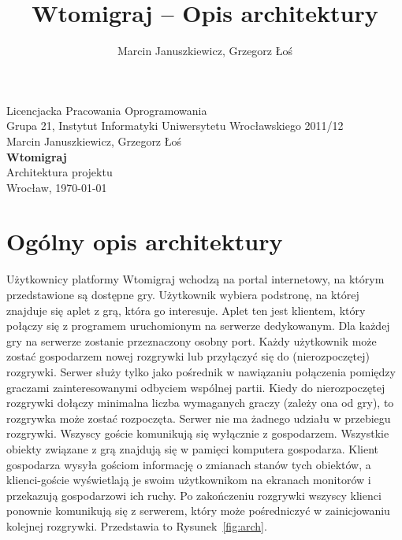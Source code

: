 \documentclass[a4paper, 12pt]{article}
\author{Marcin Januszkiewicz, Grzegorz Łoś}
\title{\textbf{Wtomigraj} -- Opis architektury}
\begin{document}

\begin{titlepage}
\begin{center}

\thispagestyle{empty}
{\Large Licencjacka Pracowania Oprogramowania}\\[0.5cm]
{\Large Grupa 21, Instytut Informatyki Uniwersytetu Wrocławskiego 2011/12}\\[2.5cm]

{\large Marcin Januszkiewicz, Grzegorz Łoś}\\[0.5cm]
{\huge \textbf{Wtomigraj}}\\[0.5cm]
{\huge Architektura projektu}\\[0.5cm]
\vfill
{\large Wrocław, \today}

\end{center}
\end{titlepage}

\setcounter{page}{2}

\tableofcontents

\break

\section{Ogólny opis architektury}

Użytkownicy platformy Wtomigraj wchodzą na portal internetowy, na którym przedstawione są dostępne gry. Użytkownik wybiera podstronę, na której znajduje się aplet z grą, która go interesuje. Aplet ten jest klientem, który połączy się z programem uruchomionym na serwerze dedykowanym. Dla każdej gry na serwerze zostanie przeznaczony osobny port. Każdy użytkownik może zostać gospodarzem nowej rozgrywki lub przyłączyć się do (nierozpoczętej) rozgrywki. Serwer służy tylko jako pośrednik w nawiązaniu połączenia pomiędzy graczami zainteresowanymi odbyciem wspólnej partii. Kiedy do nierozpoczętej rozgrywki dołączy minimalna liczba wymaganych graczy (zależy ona od gry), to rozgrywka może zostać rozpoczęta. Serwer nie ma żadnego udziału w przebiegu rozgrywki. Wszyscy goście komunikują się wyłącznie z gospodarzem. Wszystkie obiekty związane z grą znajdują się w pamięci komputera gospodarza. Klient gospodarza wysyła gościom informację o zmianach stanów tych obiektów, a klienci-goście wyświetlają je swoim użytkownikom na ekranach monitorów i przekazują gospodarzowi ich ruchy. Po zakończeniu rozgrywki wszyscy klienci ponownie komunikują się z serwerem, który może pośredniczyć w zainicjowaniu kolejnej rozgrywki. Przedstawia to Rysunek~\ref{fig:arch}.
\end{document}
